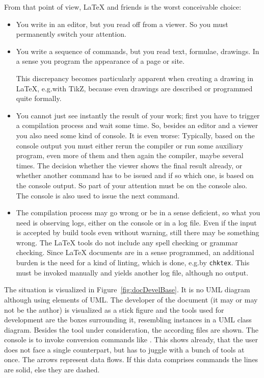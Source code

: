 From that point of view, \LaTeX{} and friends is the worst conceivable choice: 
%
\begin{itemize}
  \item
  You write in an editor, but you read off from a viewer. 
  So you must permanently switch your attention. 
  \item
  You write a sequence of commands, but you read text, formulae, drawings. 
  In a sense you program the appearance of a page or site. 

  This discrepancy becomes particularly apparent when creating a drawing in \LaTeX, 
  e.g.\@ with TikZ, because even drawings are described or programmed quite formally. 
  \item
  You cannot just see instantly the result of your work; 
  first you have to trigger a compilation process and wait some time. 
  So, besides an editor and a viewer you also need some kind of console. 
  It is even worse: 
  Typically, based on the console output you must either rerun the compiler 
  or run some auxiliary program, even more of them 
  and then again the compiler, maybe several times. 
  The decision whether the viewer shows the final result already, 
  or whether another command has to be issued and if so which one, 
  is based on the console output. 
  So part of your attention must be on the console also. 
  The console is also used to issue the next command. 
  \item 
  The compilation process may go wrong or be in a sense deficient, 
  so what you need is observing logs, either on the console or in a log file. 
  Even if the input is accepted by build tools even without warning, 
  still there may be something wrong. 
  The \LaTeX{} tools do not include any spell checking or grammar checking. 
  Since \LaTeX{} documents are in a sense programmed, 
  an additional burden is the need for a kind of linting, 
  which is done, e.g.\@ by \texttt{chktex}. 
  This must be invoked manually and yields another log file, 
  although no output. 
\end{itemize}

The situation is visualized in Figure~\ref{fig:docDevelBase}. 
It is no UML diagram although using elements of UML\@. 
The developer of the document (it may or may not be the author) 
is visualized as a stick figure 
and the tools used for development are the boxes surrounding it,
resembling instances in a UML class diagram. 
Besides the tool under consideration, the according files are shown. 
The console is to invoke conversion commands like \lualatex. 
This shows already, that the user does not face a single counterpart, 
but has to juggle with a bunch of tools at once. 
The arrows represent data flows. 
If this data comprises commands the lines are solid, else they are dashed. 

